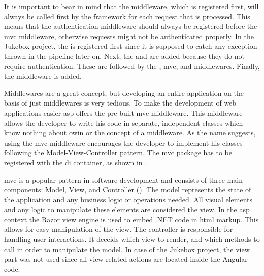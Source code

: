 It is important to bear in mind that the middleware, which is registered first, will always be called first by the framework for each request that is processed. This means that the authentication middleware should always be registered before the \gls{mvc} middleware, otherwise requests might not be authenticated properly. In the Jukebox project, the  is registered first since it is supposed to catch any exception thrown in the pipeline later on. Next, the  and  are added because they do not require authentication. These are followed by the , \gls{mvc}, and  middlewares. Finally, the  middleware is added.

\newpage




Middlewares are a great concept, but developing an entire application on the basis of just middlewares is very tedious. To make the development of web applications easier \gls{asp} offers the pre-built \gls{mvc} middleware. This middleware allows the developer to write his code in separate, independent classes which know nothing about \gls{owin} or the concept of a middleware. As the name suggests, using the \gls{mvc} middleware encourages the developer to implement his classes following the Model-View-Controller pattern. The \gls{mvc} package has to be registered with the \gls{di} container, as shown in .

\gls{mvc} is a popular pattern in software development and consists of three main components: Model, View, and Controller (). The model represents the state of the application and any business logic or operations needed. All visual elements and any logic to manipulate these elements are considered the view. In the \gls{asp} context the Razor view engine is used to embed .NET code in \gls{html} markup. This allows for easy manipulation of the view. The controller is responsible for handling user interactions. It deceids which view to render, and which methods to call in order to manipulate the model. In case of the Jukebox project, the view part was not used since all view-related actions are located inside the Angular code. \cite{mvcOverview}


